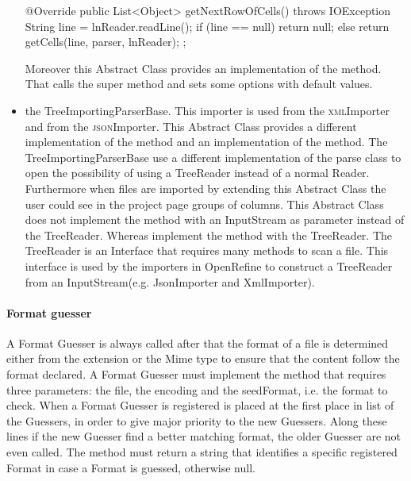 \begin{itemize}
\begin{code}
{   @Override
   public List<Object> getNextRowOfCells() 
                            throws IOException {
      String line = lnReader.readLine();
         if (line == null) {
            return null;
         } else {
            return getCells(line, parser, lnReader);
         }
   }
}; 
	 \end{code}
	 Moreover this Abstract Class provides an implementation of the  method. That calls the super method and sets some options with default values.
	\item the TreeImportingParserBase. This importer is used from the \textsc{xml}Importer and from the \textsc{json}Importer. This Abstract Class provides a different implementation of the  method and an implementation of the  method. The TreeImportingParserBase use a different implementation of the parse class to open the possibility of using a TreeReader instead of a normal Reader. Furthermore when files are imported by extending this Abstract Class the user could see in the project page groups of columns. This Abstract Class does not implement the  method with an InputStream as parameter instead of the TreeReader. Whereas implement the  method with the TreeReader. The TreeReader is an Interface that requires many methods to scan a file. This interface is used by the importers in OpenRefine to construct a TreeReader from an InputStream(e.g. JsonImporter and XmlImporter). 
\end{itemize}

\paragraph{Format guesser} A Format Guesser is always called after that the format of a file is determined either from the extension or the Mime type to ensure that the content follow the format declared. A Format Guesser must implement the  method that requires three parameters: the file, the encoding and the seedFormat, i.e. the format to check. When a Format Guesser is registered is placed at the first place in list of the Guessers, in order to give major priority to the new Guessers. Along these lines if the new Guesser find a better matching format, the older Guesser are not even called. The  method must return a string that identifies a specific registered Format in case a Format is guessed, otherwise null.
\begin{code}
public class LineBasedFormatGuesser implements FormatGuesser {

    @Override
    public String guess(File file, 
                        String encoding, 
                        String seedFormat) { 
    String result = null;
    
    // try to guess the format
    ...
    
    return result;
\end{code}

